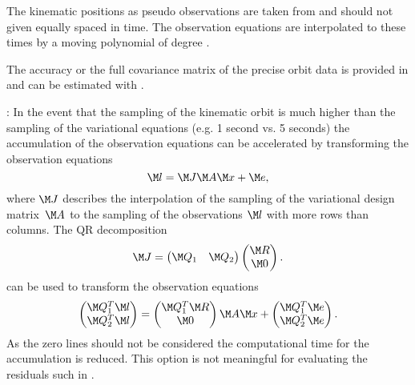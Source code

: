 The kinematic positions as pseudo observations are taken from
 and should not given equally spaced in time. The observation
equations are interpolated to these times by a moving polynomial of degree .

The accuracy or the full covariance matrix of the precise orbit data is provided in
 and can be estimated with .

: In the event that the sampling of the kinematic orbit is much higher than the sampling
of the variational equations (e.g. 1 second vs. 5 seconds) the accumulation of the observation equations
can be accelerated by transforming the observation equations
\begin{equation}
  \M l = \M J \M A \M x + \M e,
\end{equation}
where $\M J$ describes the interpolation of the sampling of the variational design matrix~$\M A$
to the sampling of the observations $\M l$ with more rows than columns. The QR decomposition
\begin{equation}
  \M J = \begin{pmatrix} \M Q_1 & \M Q_2 \end{pmatrix}
         \begin{pmatrix} \M R \\ \M 0 \end{pmatrix}.
\end{equation}
can be used to transform the observation equations
\begin{equation}
  \begin{pmatrix} \M Q_1^T \M l \\ \M Q_2^T \M l \end{pmatrix} =
  \begin{pmatrix} \M Q_1^T \M R \\ \M 0 \end{pmatrix} \M A \M x +
  \begin{pmatrix} \M Q_1^T \M e \\ \M Q_2^T \M e \end{pmatrix}.
\end{equation}
As the zero lines should not be considered the computational time for the accumulation is reduced.
This option is not meaningful for evaluating the residuals such in .



